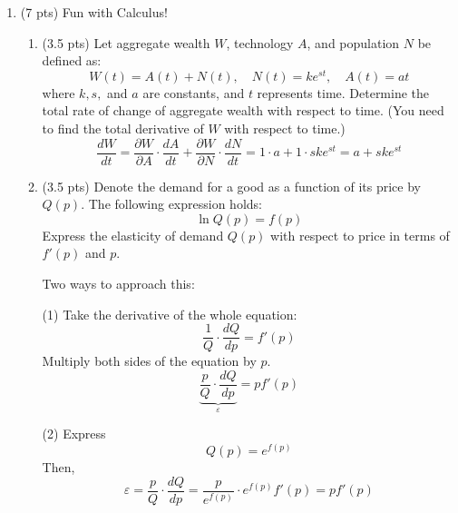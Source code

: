 \documentclass{./../../../Latex/tests}
\begin{document}
\begin{enumerate}
\newpage
\item (7 pts) Fun with Calculus!
\begin{enumerate}
\item (3.5 pts) Let aggregate wealth \( W \), technology $A$, and population \( N \) be defined as:
\[
W(t) = A(t) + N(t), \quad N(t) = k e^{st}, \quad A(t) = at
\]
where \(k, s,\) and \( a \) are constants, and \( t \) represents time. Determine the total rate of change of aggregate wealth with respect to time. (You need to find the total derivative of $W$ with respect to time.)
\[
\frac{dW}{dt} = \frac{\partial W}{ \partial A}\cdot \frac{dA}{dt} + \frac{\partial W}{\partial N} \cdot \frac{dN}{dt} = 1\cdot a + 1 \cdot sk e^{st} = a + sk e^{st}
\] \vspace{0.25em}
\item (3.5 pts) Denote the demand for a good as a function of its price by $Q(p)$. The following expression holds:
$$ \ln Q(p) =  f(p)  $$
Express the elasticity of demand $Q(p)$ with respect to price in terms of $f'(p)$ and $p$. 

Two ways to approach this:

(1) Take the derivative of the whole equation:
$$ \frac{1}{Q}\cdot \frac{dQ}{dp} = f'(p)$$
Multiply both sides of the equation by $p$. 
$$ \underbrace{\frac{p}{Q}\cdot \frac{dQ}{dp}}_{\varepsilon} = pf'(p)$$

(2) Express $$Q(p) = e^{f(p)}$$
Then,
$$ \varepsilon = \frac{p}{Q}\cdot \frac{dQ}{dp} = \frac{p}{e^{f(p)}}\cdot e^{f(p)} f'(p) = pf'(p) $$
\end{enumerate}
\end{enumerate}
\end{document}
